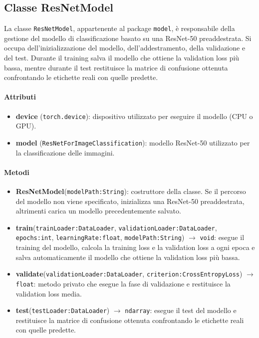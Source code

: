 \subsection{Classe ResNetModel}

La classe \texttt{ResNetModel}, appartenente al package \texttt{model}, è
responsabile della gestione del modello di classificazione basato su una
ResNet-50 preaddestrata. Si occupa dell’inizializzazione del modello,
dell’addestramento, della validazione e del
test. Durante il training salva il modello che ottiene la validation loss più
bassa, mentre durante il test restituisce la matrice di confusione
ottenuta confrontando le etichette reali con quelle predette.

\paragraph{Attributi}

\begin{itemize}
    \raggedright
    \item \textbf{device} (\texttt{torch.device}): dispositivo utilizzato
    per eseguire il modello (CPU o GPU).
    \item \textbf{model} (\texttt{ResNetForImageClassification}): modello
    ResNet-50 utilizzato per la classificazione delle immagini.
\end{itemize}

\paragraph{Metodi}

\begin{itemize}
    \raggedright
    \item \textbf{ResNetModel}(\texttt{modelPath:String}): costruttore
    della classe. Se il percorso del modello non viene specificato,
    inizializza una ResNet-50 preaddestrata, altrimenti carica un modello
    precedentemente salvato.
    \item \textbf{train}(\texttt{trainLoader:DataLoader},
    \texttt{validationLoader:DataLoader}, \texttt{epochs:int},
    \texttt{learningRate:float}, \texttt{modelPath:String})
    $\rightarrow$ \texttt{void}: esegue il training del modello, calcola la
    training loss e la validation loss a ogni epoca e salva automaticamente
    il modello che ottiene la validation loss più bassa.
    \item \textbf{validate}(\texttt{validationLoader:DataLoader},
    \texttt{criterion:CrossEntropyLoss}) $\rightarrow$ \texttt{float}:
    metodo privato che esegue la fase di validazione e restituisce la
    validation loss media.
    \item \textbf{test}(\texttt{testLoader:DataLoader})
    $\rightarrow$ \texttt{ndarray}: esegue il test del modello e restituisce
    la matrice di confusione ottenuta confrontando le etichette reali con
    quelle predette.
\end{itemize}

